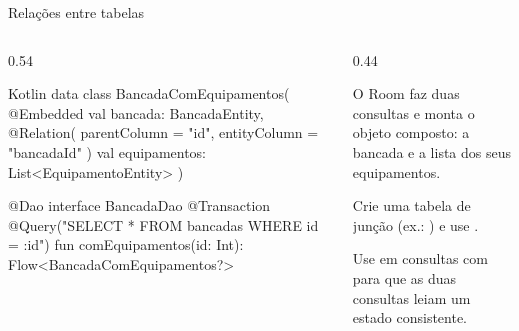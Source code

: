 \documentclass[aspectratio=169,10pt]{beamer}
\begin{document}
\begin{frame}[fragile]{Relações entre tabelas}
  \begin{columns}[T]
    \begin{column}{0.54\textwidth}
\begin{codigo}[title=Um-para-muitos]{Kotlin}
data class BancadaComEquipamentos(
  @Embedded val bancada: BancadaEntity,
  @Relation(
    parentColumn = "id",
    entityColumn = "bancadaId"
  )
  val equipamentos: List<EquipamentoEntity>
)

@Dao
interface BancadaDao {
  @Transaction
  @Query("SELECT * FROM bancadas WHERE id = :id")
  fun comEquipamentos(id: Int):
    Flow<BancadaComEquipamentos?>
}
\end{codigo}
    \end{column}
    \begin{column}{0.44\textwidth}
      \begin{conceito}
        O Room faz duas consultas e monta o objeto composto: a bancada e a lista dos seus equipamentos.
      \end{conceito}
      \begin{dica}
        Crie uma tabela de junção (ex.: ) e use .
      \end{dica}
      \begin{atencao}
        Use  em consultas com  para que as duas consultas leiam um estado consistente.
      \end{atencao}
    \end{column}
  \end{columns}
\end{frame}
\end{document}
